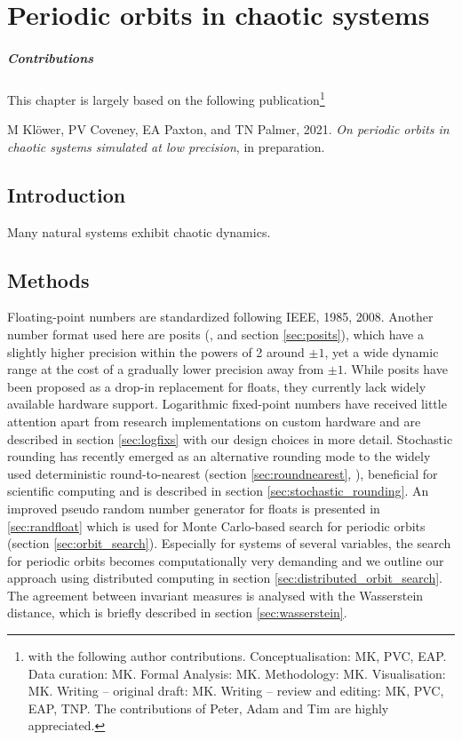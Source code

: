 \chapter{Periodic orbits in chaotic systems}
\label{chap:orbits}

\small \paragraph{Contributions} This chapter is largely based on the following publication\footnote{with the following author contributions.
Conceptualisation: MK, PVC, EAP. Data curation: MK. Formal Analysis: MK. Methodology: MK. Visualisation: MK. Writing – original draft:
MK. Writing – review and editing: MK, PVC, EAP, TNP. The contributions of Peter, Adam and Tim are highly appreciated.}

\vspace{\baselineskip}
\indent M Klöwer, PV Coveney, EA Paxton, and TN Palmer, 2021.
\emph{On periodic orbits in chaotic systems simulated at low precision}, in preparation.
\vspace{\baselineskip}
\normalsize

\section{Introduction}

Many natural systems exhibit chaotic dynamics.

\section{Methods}

Floating-point numbers are standardized following IEEE, 1985, 2008. Another number format used here are posits
(\cite{Gustafson2017a}, and section \ref{sec:posits}), which have a slightly higher precision within the powers of 2
around $\pm1$, yet a wide dynamic range at the cost of a gradually lower precision away from $\pm1$. While posits
have been proposed as a drop-in replacement for floats, they currently lack widely available hardware support.
Logarithmic fixed-point numbers have received little attention apart from research implementations on custom hardware
\citep{Johnson2020} and are described in section \ref{sec:logfixs} with our design choices in more detail.
Stochastic rounding has recently emerged as an alternative rounding mode to the widely used deterministic round-to-nearest
(section \ref{sec:roundnearest}, \cite{IEEE1985}), beneficial for scientific computing
\citep{Croci2020,Fasi2021,Hopkins2020,Paxton2021} and is described in section \ref{sec:stochastic_rounding}. An improved
pseudo random number generator for floats is presented in \ref{sec:randfloat} which is used for Monte Carlo-based
search for periodic orbits (section \ref{sec:orbit_search}). Especially for systems of several variables, the search for
periodic orbits becomes computationally very demanding and we outline our approach using distributed computing
in section \ref{sec:distributed_orbit_search}. The agreement between invariant measures is analysed with the
Wasserstein distance, which is briefly described in section \ref{sec:wasserstein}.

